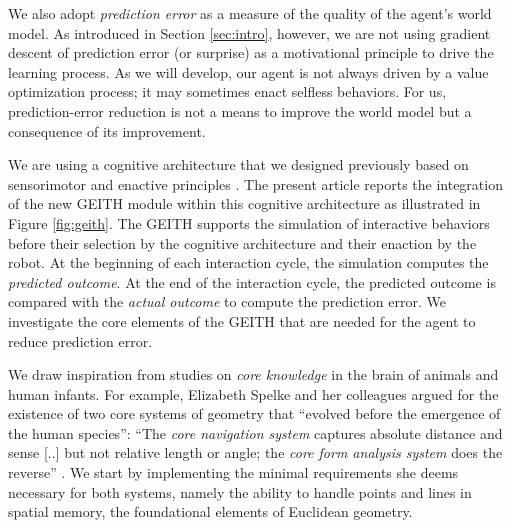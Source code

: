 \documentclass[runningheads]{llncs}
\begin{document}
We also adopt \textit{prediction error} as a measure of the quality of the agent's world model. %
As introduced in Section \ref{sec:intro}, however, we are not using gradient descent of prediction error (or surprise) as a motivational principle to drive the learning process. 
As we will develop, our agent is not always driven by a value optimization process; it may sometimes enact selfless behaviors.
For us, prediction-error reduction is not a means to improve the world model but a consequence of its improvement.

We are using a cognitive architecture that we designed previously based on sensorimotor and enactive principles \cite{georgeon_artificial_2024}. 
The present article reports the integration of the new GEITH module within this cognitive architecture as illustrated in Figure \ref{fig:geith}. 
The GEITH supports the simulation of interactive behaviors before their selection by the cognitive architecture and their enaction by the robot. 
At the beginning of each interaction cycle, the simulation computes the \textit{predicted outcome}.
At the end of the interaction cycle, the predicted outcome is compared with the \textit{actual outcome} to compute the prediction error.   
We investigate the core elements of the GEITH that are needed for the agent to reduce prediction error. 

We draw inspiration from studies on \textit{core knowledge} in the brain of animals and human infants. 
For example, Elizabeth Spelke and her colleagues argued for the existence of two core systems of geometry that ``evolved before the emergence of the human species'':  
``The \textit{core navigation system} captures absolute distance and sense [..] but not relative length or angle; the \textit{core form analysis system} does the reverse'' \cite[p. 2789]{spelke_core_2012}.
We start by implementing the minimal requirements she deems necessary for both systems, namely the ability to handle points and lines in spatial memory, the foundational elements of Euclidean geometry. 
\end{document}
